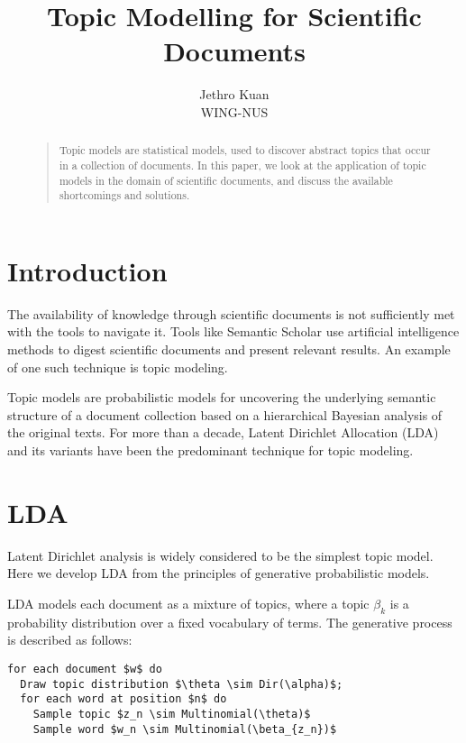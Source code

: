 \documentclass[letterpaper]{article}
\begin{document}
\nocopyright


\title{Topic Modelling for Scientific Documents}
\author{Jethro Kuan \\
  WING-NUS\\
}
\maketitle
\begin{abstract}
  \begin{quote}
    Topic models are statistical models, used to discover abstract
    topics that occur in a collection of documents. In this paper, we
    look at the application of topic models in the domain of
    scientific documents, and discuss the available shortcomings and
    solutions.
  \end{quote}
\end{abstract}

\section{Introduction}
The availability of knowledge through scientific documents is not
sufficiently met with the tools to navigate it. Tools like Semantic
Scholar use artificial intelligence methods to digest scientific
documents and present relevant results. An example of one such
technique is topic modeling.

Topic models are probabilistic models for uncovering the underlying
semantic structure of a document collection based on a hierarchical
Bayesian analysis of the original texts. For more than a decade,
Latent Dirichlet Allocation (LDA) and its variants have been the
predominant technique for topic modeling.

\section{LDA}
Latent Dirichlet analysis is widely considered to be the simplest
topic model. Here we develop LDA from the principles of generative
probabilistic models.

LDA models each document as a mixture of topics, where a topic
$\beta_k$ is a probability distribution over a fixed vocabulary of
terms. The generative process is described as follows:

\begin{lstlisting}[mathescape=true]
for each document $w$ do
  Draw topic distribution $\theta \sim Dir(\alpha)$;
  for each word at position $n$ do
    Sample topic $z_n \sim Multinomial(\theta)$
    Sample word $w_n \sim Multinomial(\beta_{z_n})$
\end{lstlisting}
\end{document}
